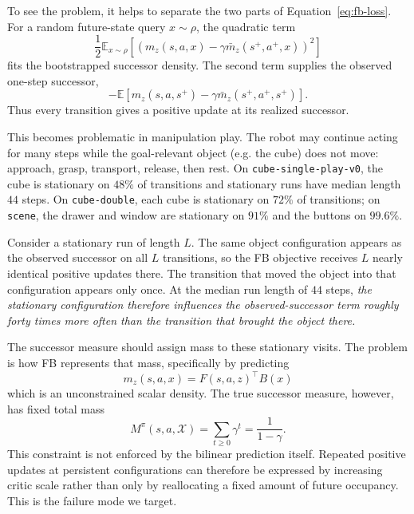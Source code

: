 \documentclass{article}
\newcommand{\E}{\mathbb{E}}
\begin{document}
To see the problem, it helps to separate the two parts of Equation~\ref{eq:fb-loss}.
For a random future-state query $x\sim\rho$, the quadratic term
\begin{equation}
\frac12
\E_{x\sim\rho}
\left[
    \left(
        m_z(s,a,x)
        -
        \gamma\bar m_z(s^+,a^+,x)
    \right)^2
\right]
\end{equation}
fits the bootstrapped successor density.
The second term supplies the observed one-step successor,
\begin{equation}
-
\E\left[
    m_z(s,a,s^+)
    -
    \gamma\bar m_z(s^+,a^+,s^+)
\right].
\end{equation}
Thus every transition gives a positive update at its realized successor.

This becomes problematic in manipulation play.
The robot may continue acting for many steps while the goal-relevant object (e.g. the cube) does not move: approach, grasp, transport, release, then rest.
On \texttt{cube-single-play-v0}, the cube is stationary on $48\%$ of transitions and stationary runs have median length $44$ steps.
On \texttt{cube-double}, each cube is stationary on $72\%$ of transitions; on \texttt{scene}, the drawer and window are stationary on $91\%$ and the buttons on $99.6\%$.

Consider a stationary run of length $L$.
The same object configuration appears as the observed successor on all $L$ transitions, so the FB objective receives $L$ nearly identical positive updates there.
The transition that moved the object into that configuration appears only once.
At the median run length of $44$ steps, \emph{the stationary configuration therefore influences the observed-successor term roughly forty times more often than the transition that brought the object there.}

The successor measure should assign mass to these stationary visits.
The problem is how FB represents that mass, specifically by predicting
\begin{equation}
    m_z(s,a,x)=F(s,a,z)^\top B(x)
\end{equation}
which is an unconstrained scalar density.
The true successor measure, however, has fixed total mass
\begin{equation}
M^\pi(s,a,\mathcal X) = \sum_{t\ge0}\gamma^t = \frac{1}{1-\gamma}.
\end{equation}
This constraint is not enforced by the bilinear prediction itself.
Repeated positive updates at persistent configurations can therefore be expressed by increasing critic scale rather than only by reallocating a fixed amount of future occupancy.
This is the failure mode we target.
\end{document}
